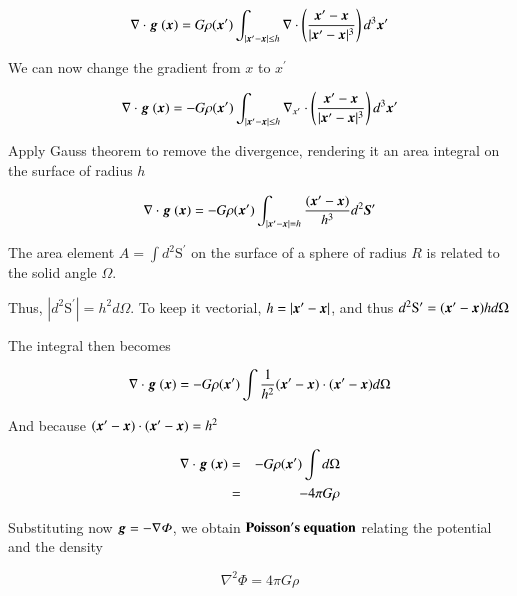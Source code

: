 \begin{equation}
\nabla \cdot {\boldsymbol{g}}\ ({\boldsymbol{x}}) =  G \rho({\boldsymbol{x}}^\prime)\int_{|{\boldsymbol{x}}^\prime-{\boldsymbol{x}}|\leq h}   \nabla \cdot \left( \frac{{\boldsymbol{x}}^\prime - {\boldsymbol{x}}}{|{\boldsymbol{x}}^\prime-{\boldsymbol{x}}|^3} \right) d^3{\boldsymbol{x}}^\prime
\end{equation}

We can now change the gradient from $x$ to $x^\prime$

\begin{equation}
\nabla \cdot {\boldsymbol{g}}\ ({\boldsymbol{x}}) =  - G \rho({\boldsymbol{x}}^\prime)\int_{|{\boldsymbol{x}}^\prime-{\boldsymbol{x}}|\leq h}   \nabla_{x^\prime} \cdot \left( \frac{{\boldsymbol{x}}^\prime - {\boldsymbol{x}}}{|{\boldsymbol{x}}^\prime-{\boldsymbol{x}}|^3} \right) d^3{\boldsymbol{x}}^\prime
\end{equation}

Apply Gauss theorem to remove the divergence, rendering it an area integral on the surface of radius $h$

\begin{equation}
\nabla \cdot {\boldsymbol{g}}\ ({\boldsymbol{x}}) =  -G \rho({\boldsymbol{x}}^\prime)\int_{|{\boldsymbol{x}}^\prime-{\boldsymbol{x}}|= h} \frac{({\boldsymbol{x}}^\prime - {\boldsymbol{x}})}{h^3} d^2{\boldsymbol{S}}^\prime
\end{equation}

The area element $A=\int d^2\mathrm{S}^\prime$ on the surface of a sphere of radius $R$ is related to the solid angle $\Omega$.

Thus, $|d^2\mathrm{S}^\prime| = h^2 d\Omega$. To keep it vectorial, $h = |{\boldsymbol{x}}^\prime-{\boldsymbol{x}}|$, and thus  $d^2\mathrm{S}^\prime = ({\boldsymbol{x}}^\prime-{\boldsymbol{x}})h d\Omega$

The integral then becomes 

\begin{equation}
\nabla \cdot {\boldsymbol{g}}\ ({\boldsymbol{x}}) =  -G \rho({\boldsymbol{x}}^\prime)\int \frac{1}{h^2}({\boldsymbol{x}}^\prime - {\boldsymbol{x}})\cdot ({\boldsymbol{x}}^\prime-{\boldsymbol{x}}) d\Omega
\end{equation}

And because $({\boldsymbol{x}}^\prime - {\boldsymbol{x}})\cdot ({\boldsymbol{x}}^\prime-{\boldsymbol{x}}) = h^2$

\begin{eqnarray}
\nabla \cdot {\boldsymbol{g}}\ ({\boldsymbol{x}}) &=&  -G \rho({\boldsymbol{x}}^\prime)\int d\Omega\\
&=&-4\pi G \rho
\end{eqnarray}

Substituting now ${\boldsymbol{g}} = -\nabla\varPhi$, we obtain $\bf{Poisson's \ equation}$ relating the potential and the density

\begin{equation}
\boxed{\nabla^2\varPhi=  4\pi G \rho}
\end{equation}


